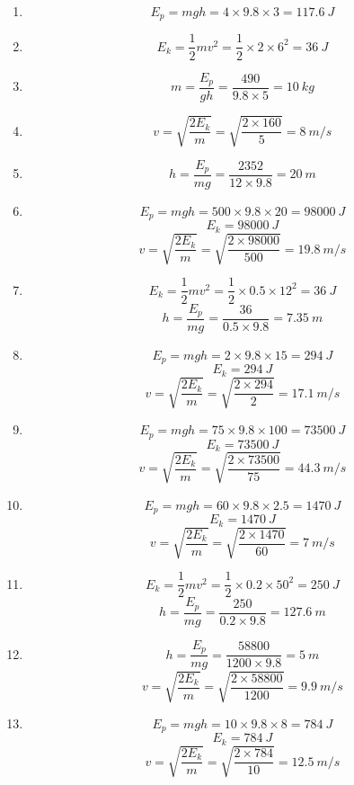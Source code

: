 \documentclass[12pt]{article}
\begin{document}
\begin{enumerate}

\item
\[
E_p = mgh = 4 \times 9.8 \times 3 = \SI{117.6}{J}
\]

\item
\[
E_k = \frac{1}{2}mv^2 = \frac{1}{2} \times 2 \times 6^2 = \SI{36}{J}
\]

\item
\[
m = \frac{E_p}{gh} = \frac{490}{9.8 \times 5} = \SI{10}{kg}
\]

\item
\[
v = \sqrt{\frac{2E_k}{m}} = \sqrt{\frac{2 \times 160}{5}} = \SI{8}{m/s}
\]

\item
\[
h = \frac{E_p}{mg} = \frac{2352}{12 \times 9.8} = \SI{20}{m}
\]

\item
\[
E_p = mgh = 500 \times 9.8 \times 20 = \SI{98000}{J}
\]
\[
E_k = \SI{98000}{J}
\]
\[
v = \sqrt{\frac{2E_k}{m}} = \sqrt{\frac{2 \times 98000}{500}} = \SI{19.8}{m/s}
\]

\item
\[
E_k = \frac{1}{2}mv^2 = \frac{1}{2} \times 0.5 \times 12^2 = \SI{36}{J}
\]
\[
h = \frac{E_p}{mg} = \frac{36}{0.5 \times 9.8} = \SI{7.35}{m}
\]

\item
\[
E_p = mgh = 2 \times 9.8 \times 15 = \SI{294}{J}
\]
\[
E_k = \SI{294}{J}
\]
\[
v = \sqrt{\frac{2E_k}{m}} = \sqrt{\frac{2 \times 294}{2}} = \SI{17.1}{m/s}
\]

\item
\[
E_p = mgh = 75 \times 9.8 \times 100 = \SI{73500}{J}
\]
\[
E_k = \SI{73500}{J}
\]
\[
v = \sqrt{\frac{2E_k}{m}} = \sqrt{\frac{2 \times 73500}{75}} = \SI{44.3}{m/s}
\]

\item
\[
E_p = mgh = 60 \times 9.8 \times 2.5 = \SI{1470}{J}
\]
\[
E_k = \SI{1470}{J}
\]
\[
v = \sqrt{\frac{2E_k}{m}} = \sqrt{\frac{2 \times 1470}{60}} = \SI{7}{m/s}
\]

\item
\[
E_k = \frac{1}{2}mv^2 = \frac{1}{2} \times 0.2 \times 50^2 = \SI{250}{J}
\]
\[
h = \frac{E_p}{mg} = \frac{250}{0.2 \times 9.8} = \SI{127.6}{m}
\]

\item
\[
h = \frac{E_p}{mg} = \frac{58800}{1200 \times 9.8} = \SI{5}{m}
\]
\[
v = \sqrt{\frac{2E_k}{m}} = \sqrt{\frac{2 \times 58800}{1200}} = \SI{9.9}{m/s}
\]

\item
\[
E_p = mgh = 10 \times 9.8 \times 8 = \SI{784}{J}
\]
\[
E_k = \SI{784}{J}
\]
\[
v = \sqrt{\frac{2E_k}{m}} = \sqrt{\frac{2 \times 784}{10}} = \SI{12.5}{m/s}
\]


\end{enumerate}
\end{document}
